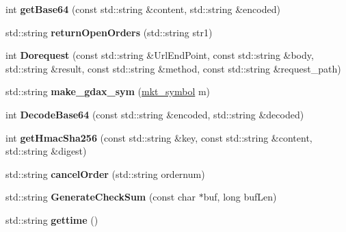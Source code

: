 \begin{DoxyCompactItemize}
\item 
\mbox{\label{classclient__gdax_aa0476039a3b2f149452aecae545174f1}} 
int {\bfseries get\+Base64} (const std\+::string \&content, std\+::string \&encoded)
\item 
\mbox{\label{classclient__gdax_a0bc53d1588520768f5e63ecf93b66c78}} 
std\+::string {\bfseries return\+Open\+Orders} (std\+::string str1)
\item 
\mbox{\label{classclient__gdax_a9395e877baf8c69343e9b9e6792bc403}} 
int {\bfseries Dorequest} (const std\+::string \&Url\+End\+Point, const std\+::string \&body, std\+::string \&result, const std\+::string \&method, const std\+::string \&request\+\_\+path)
\item 
\mbox{\label{classclient__gdax_a2ae55cb58430803493b370cf73fb8089}} 
std\+::string {\bfseries make\+\_\+gdax\+\_\+sym} (\mbox{\hyperlink{structmkt__symbol}{mkt\+\_\+symbol}} m)
\item 
\mbox{\label{classclient__gdax_a0f3e334bbaebc75cf56f27cf7783f999}} 
int {\bfseries Decode\+Base64} (const std\+::string \&encoded, std\+::string \&decoded)
\item 
\mbox{\label{classclient__gdax_a37776491211b838c1ad158a175080020}} 
int {\bfseries get\+Hmac\+Sha256} (const std\+::string \&key, const std\+::string \&content, std\+::string \&digest)
\item 
\mbox{\label{classclient__gdax_aef2b4a68ce70c604a29c57496f129741}} 
std\+::string {\bfseries cancel\+Order} (std\+::string ordernum)
\item 
\mbox{\label{classclient__gdax_ac15410e231beae59a576d82095ddfe71}} 
std\+::string {\bfseries Generate\+Check\+Sum} (const char $\ast$buf, long buf\+Len)
\item 
\mbox{\label{classclient__gdax_adf9a3134a5e5835a1a2993889253cece}} 
std\+::string {\bfseries gettime} ()
\item 
\mbox{\label{classclient__gdax_a27e0b53b9b8a18b6c898f2ae09d1c383}} 

\end{DoxyCompactItemize}
